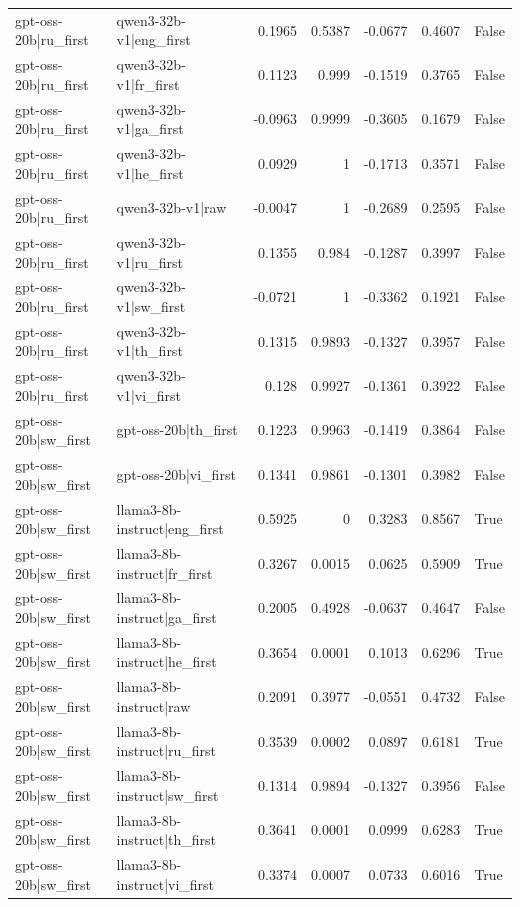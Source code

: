 \begin{table}
\begin{tabular}{l l r r r r l}
gpt-oss-20b|ru_first & qwen3-32b-v1|eng_first & 0.1965 & 0.5387 & -0.0677 & 0.4607 & False \\
gpt-oss-20b|ru_first & qwen3-32b-v1|fr_first & 0.1123 & 0.999 & -0.1519 & 0.3765 & False \\
gpt-oss-20b|ru_first & qwen3-32b-v1|ga_first & -0.0963 & 0.9999 & -0.3605 & 0.1679 & False \\
gpt-oss-20b|ru_first & qwen3-32b-v1|he_first & 0.0929 & 1 & -0.1713 & 0.3571 & False \\
gpt-oss-20b|ru_first & qwen3-32b-v1|raw & -0.0047 & 1 & -0.2689 & 0.2595 & False \\
gpt-oss-20b|ru_first & qwen3-32b-v1|ru_first & 0.1355 & 0.984 & -0.1287 & 0.3997 & False \\
gpt-oss-20b|ru_first & qwen3-32b-v1|sw_first & -0.0721 & 1 & -0.3362 & 0.1921 & False \\
gpt-oss-20b|ru_first & qwen3-32b-v1|th_first & 0.1315 & 0.9893 & -0.1327 & 0.3957 & False \\
gpt-oss-20b|ru_first & qwen3-32b-v1|vi_first & 0.128 & 0.9927 & -0.1361 & 0.3922 & False \\
gpt-oss-20b|sw_first & gpt-oss-20b|th_first & 0.1223 & 0.9963 & -0.1419 & 0.3864 & False \\
gpt-oss-20b|sw_first & gpt-oss-20b|vi_first & 0.1341 & 0.9861 & -0.1301 & 0.3982 & False \\
gpt-oss-20b|sw_first & llama3-8b-instruct|eng_first & 0.5925 & 0 & 0.3283 & 0.8567 & True \\
gpt-oss-20b|sw_first & llama3-8b-instruct|fr_first & 0.3267 & 0.0015 & 0.0625 & 0.5909 & True \\
gpt-oss-20b|sw_first & llama3-8b-instruct|ga_first & 0.2005 & 0.4928 & -0.0637 & 0.4647 & False \\
gpt-oss-20b|sw_first & llama3-8b-instruct|he_first & 0.3654 & 0.0001 & 0.1013 & 0.6296 & True \\
gpt-oss-20b|sw_first & llama3-8b-instruct|raw & 0.2091 & 0.3977 & -0.0551 & 0.4732 & False \\
gpt-oss-20b|sw_first & llama3-8b-instruct|ru_first & 0.3539 & 0.0002 & 0.0897 & 0.6181 & True \\
gpt-oss-20b|sw_first & llama3-8b-instruct|sw_first & 0.1314 & 0.9894 & -0.1327 & 0.3956 & False \\
gpt-oss-20b|sw_first & llama3-8b-instruct|th_first & 0.3641 & 0.0001 & 0.0999 & 0.6283 & True \\
gpt-oss-20b|sw_first & llama3-8b-instruct|vi_first & 0.3374 & 0.0007 & 0.0733 & 0.6016 & True \\

\end{tabular}
\end{table}
